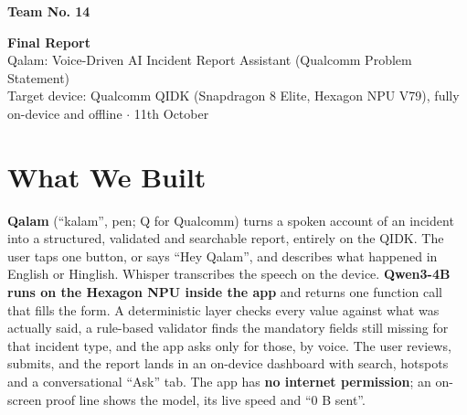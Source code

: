 \documentclass[9pt,a4paper]{extarticle}
\begin{document}
\textbf{Team No. 14}

\begin{center}
{\Large\bfseries Final Report}\\[2pt]
Qalam: Voice-Driven AI Incident Report Assistant (Qualcomm Problem Statement)\\
{\small Target device: Qualcomm QIDK (Snapdragon 8 Elite, Hexagon NPU V79), fully on-device and offline \;$\cdot$\; 11th October}
\end{center}

\section{What We Built}
\textbf{Qalam} (``kalam'', pen; Q for Qualcomm) turns a spoken account of an incident into a structured, validated and searchable report, entirely on the QIDK. The user taps one button, or says ``Hey Qalam'', and describes what happened in English or Hinglish. Whisper transcribes the speech on the device. \textbf{Qwen3-4B runs on the Hexagon NPU inside the app} and returns one function call that fills the form. A deterministic layer checks every value against what was actually said, a rule-based validator finds the mandatory fields still missing for that incident type, and the app asks only for those, by voice. The user reviews, submits, and the report lands in an on-device dashboard with search, hotspots and a conversational ``Ask'' tab. The app has \textbf{no internet permission}; an on-screen proof line shows the model, its live speed and ``0 B sent''.
\end{document}
